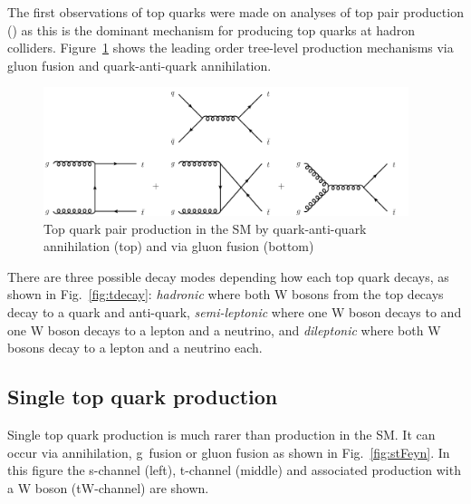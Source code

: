 The first observations of top quarks were made on analyses of top pair production (\ttbar) as this is the dominant mechanism for producing top quarks at hadron colliders. Figure~\ref{fig:ttproduction} shows the leading order tree-level production mechanisms via gluon fusion and quark-anti-quark annihilation. 

\begin{figure}[ht!]
\begin{center}
    \includegraphics[width=0.95\textwidth]{images/Theory/ttbarfeynman.png}
    \caption{Top quark pair production in the SM by quark-anti-quark annihilation (top) and via gluon fusion (bottom)~\cite{Kohn:2012ksa}}
    \label{fig:ttproduction}
\end{center}
\end{figure}

There are three possible decay modes depending how each top quark decays, as shown in Fig.~\ref{fig:tdecay}: \emph{hadronic} where both W bosons from the top decays decay to a quark and anti-quark, \emph{semi-leptonic} where one W boson decays to \qqbar and one W boson decays to a lepton and a neutrino, and \emph{dileptonic} where both W bosons decay to a lepton and a neutrino each.


\subsection{Single top quark production}

Single top quark production is much rarer than \ttbar production in the SM. It can occur via \qqbar annihilation, g\cPq~fusion or gluon fusion as shown in Fig.~\ref{fig:stFeyn}. In this figure the s-channel (left), t-channel (middle) and associated production with a W boson (tW-channel) are shown.

